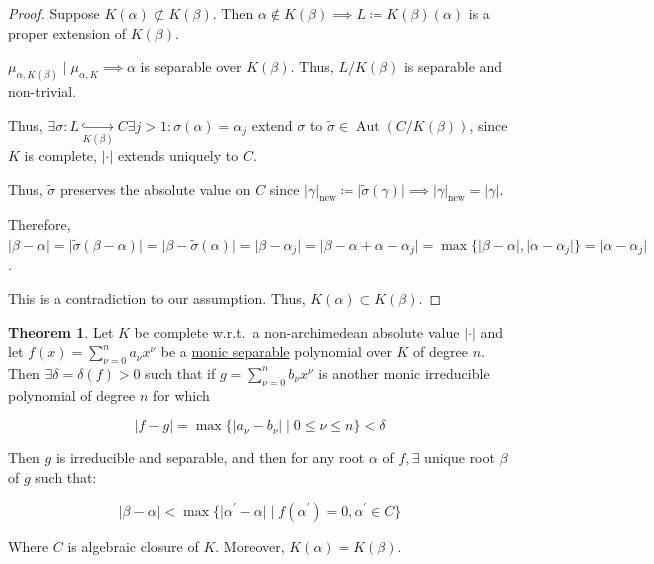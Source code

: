 \documentclass[openany]{amsbook}
\numberwithin{section}{chapter}
\theoremstyle{definition}
\newtheorem{theorem}{Theorem}[chapter]
\begin{document}
\begin{proof}
    Suppose \(K(\alpha) \not \subset K(\beta)\). Then \(\alpha \notin K(\beta) \implies L \coloneqq K(\beta)(\alpha)\) is a proper extension of \(K(\beta)\). 

    \(\mu_{\alpha ,K(\beta)} \mid \mu_{\alpha, K} \implies \alpha\) is separable over \(K(\beta)\). Thus, \(L / K(\beta)\) is separable and non-trivial.

    Thus, \(\exists \sigma : L \underset{K(\beta)}{\hookrightarrow} C \exists j > 1 : \sigma(\alpha) = \alpha_j\) extend \(\sigma\) to \(\widetilde{\sigma} \in \operatorname{Aut}(C / K(\beta))\), since \(K\)  is complete, \(\vert \cdot \vert\) extends uniquely to \(C\).
    
    Thus, \(\widetilde{\sigma}\) preserves the absolute value on \(C\) since \(\vert \gamma \vert_{\text{new}} \coloneqq \vert \widetilde{\sigma} (\gamma) \vert \implies \vert \gamma \vert_{\text{new}} = \vert \gamma \vert\).
    
    Therefore, \(\vert \beta  - \alpha \vert = \vert \widetilde{\sigma} (\beta - \alpha) \vert = \vert \beta - \widetilde{\sigma} (\alpha) \vert =\vert \beta - \alpha_j \vert = \vert \beta - \alpha + \alpha - \alpha_j \vert = \max \{ \vert \beta - \alpha \vert , \vert \alpha - \alpha_j \vert  \} = \vert \alpha - \alpha_j \vert \).
    
    This is a contradiction to our assumption. Thus, \(K(\alpha) \subset K(\beta)\).
\end{proof}

\begin{theorem}
    Let \(K\) be complete w.r.t.\ a non-archimedean absolute value \(\vert \cdot \vert \) and let \(f(x) = \sum_{\nu =0} ^ n a_\nu x^{\nu} \) be a \underline{monic separable} polynomial over \(K\) of degree \(n\). Then \(\exists \delta = \delta(f) > 0\) such that if \(g = \sum_{\nu = 0}^n b_\nu x^{\nu}\) is another monic irreducible polynomial of degree \(n\) for which
    
    \[
        \vert f - g \vert = \max \{ \vert a_\nu - b_\nu \vert \mid 0 \leq \nu \leq n \} < \delta
    \]

    Then \(g\) is irreducible and separable, and then for any root \(\alpha\) of \(f, \exists\) unique root \(\beta\) of \(g\) such that:
    
    \[
        \vert \beta - \alpha \vert < \max \{ \vert \alpha ^{\prime} - \alpha \vert \mid f(\alpha ^{\prime} )  = 0, \alpha ^{\prime} \in C\} 
    \]

    Where \(C\) is algebraic closure of \(K\). Moreover, \(K(\alpha)=K(\beta)\).
    
\end{theorem}
\end{document}
